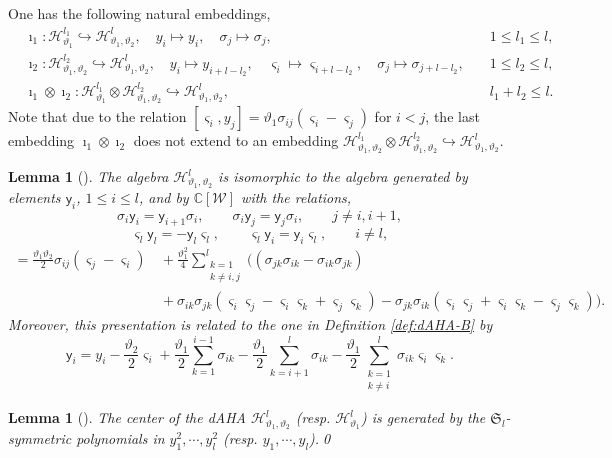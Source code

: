 \documentclass[11pt,reqno]{amsart}
\numberwithin{equation}{section}
\newtheorem{lem}[thm]{Lemma}
\theoremstyle{definition}
\theoremstyle{remark}
\newcommand{\sfy}{\mathsf{y}}
\newcommand{\fkS}{\mathfrak{S}}
\newcommand{\bC}{\mathbb{C}}
\newcommand{\lle}{\leqslant}
\newcommand{\qedd}{\tag*{$\square$}}
\begin{document}
One has the following natural embeddings,
\begin{align}
&\imath_1: \mathscr{H}_{\vartheta_1}^{l_1} \hookrightarrow\mathscr{H}_{\vartheta_1,\vartheta_2}^l,\quad y_i\mapsto y_i,\quad \sigma_j\mapsto \sigma_j, \quad &1\lle l_1\lle l,\nonumber
\\
&\imath_2: \mathscr{H}_{\vartheta_1,\vartheta_2}^{l_2} \hookrightarrow\mathscr{H}_{\vartheta_1,\vartheta_2}^l,\quad y_i\mapsto y_{i+l-l_2},\quad \varsigma_i\mapsto \varsigma_{i+l-l_2},\quad \sigma_j\mapsto \sigma_{j+l-l_2}, \quad &1\lle l_2\lle l,\nonumber
\\
& \imath_1\otimes \imath_2: \mathscr{H}_{\vartheta_1}^{l_1}\otimes \mathscr{H}_{\vartheta_1,\vartheta_2}^{l_2}\hookrightarrow \mathscr{H}_{\vartheta_1,\vartheta_2}^l,\quad &l_1+l_2\lle l.\label{eq:embedding-hecke}
\end{align}
Note that due to the relation $[\varsigma_i,y_j]=\vartheta_1\sigma_{ij}(\varsigma_i-\varsigma_j)$ for $i<j$, the last embedding $\imath_1\otimes \imath_2$ does not extend to an embedding $\mathscr{H}_{\vartheta_1,\vartheta_2}^{l_1}\otimes \mathscr{H}_{\vartheta_1,\vartheta_2}^{l_2}\hookrightarrow \mathscr{H}_{\vartheta_1,\vartheta_2}^l$.
\begin{lem} [{\cite[Lemma 3.1]{Etingof2009}}]\label{lem:dAHA-B-other}
The algebra $\mathscr{H}_{\vartheta_1,\vartheta_2}^l$ is isomorphic to the algebra generated by elements $\sfy_i$, $1\lle i\lle l$, and by $\bC[\mathscr W]$ with the relations,
\[
\sigma_i\sfy_i=\sfy_{i+1}\sigma_i,\qquad \sigma_i\sfy_j=\sfy_{j}\sigma_i,\qquad j\ne i,i+1,
\]
\[
\varsigma_l\sfy_l=-\sfy_{l}\varsigma_l,\qquad
\varsigma_l\sfy_i=\sfy_i\varsigma_l,\qquad i\ne l,
\]
\begin{align*}
    [\sfy_i,\sfy_j]= \frac{\vartheta_1 \vartheta_2}{2}\sigma_{ij}(\varsigma_j-\varsigma_i)&\,+\frac{\vartheta_1^2}{4}\sum_{\substack{k=1 \\ k\ne i,j}}^l\Big((\sigma_{jk}\sigma_{ik}-\sigma_{ik}\sigma_{jk})\\
    &\, +\sigma_{ik}\sigma_{jk}(\varsigma_i\varsigma_j-\varsigma_i\varsigma_k+\varsigma_j\varsigma_k)-\sigma_{jk}\sigma_{ik}(\varsigma_i\varsigma_j+\varsigma_i\varsigma_k-\varsigma_j\varsigma_k)\Big).
\end{align*}
Moreover, this presentation is related to the one in Definition \ref{def:dAHA-B} by
\[
\sfy_i=y_i-\frac{\vartheta_2}{2}\varsigma_i+\frac{\vartheta_1}{2}\sum_{k=1}^{i-1}\sigma_{ik}-\frac{\vartheta_1}{2}\sum_{k=i+1}^l\sigma_{ik}-\frac{\vartheta_1}{2}\sum_{\substack{k=1 \\ k\ne i}}^l\sigma_{ik}\varsigma_i\varsigma_k.\qedd
\]
\end{lem}
\begin{lem}[{\cite[3.12]{Lusztig1989affine}}]
The center of the dAHA $\mathscr{H}_{\vartheta_1,\vartheta_2}^l$ (resp. $\mathscr{H}_{\vartheta_1}^l$) is generated by the $\fkS_l$-symmetric polynomials in $y_1^2,\cdots,y_l^2$ (resp. $y_1,\cdots,y_l$).\qed
\end{lem}
\end{document}
